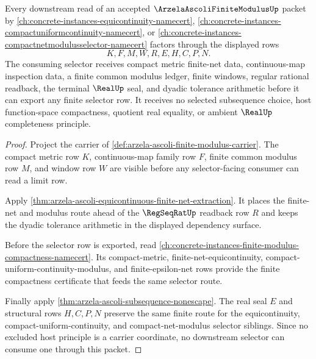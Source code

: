\begin{theorem}
\label{thm:arzela-ascoli-finite-modulus-forward-lattice}
Every downstream read of an accepted $\ArzelaAscoliFiniteModulusUp$ packet by \autoref{ch:concrete-instances-equicontinuity-namecert}, \autoref{ch:concrete-instances-compactuniformcontinuity-namecert}, or \autoref{ch:concrete-instances-compactnetmodulusselector-namecert} factors through the displayed rows
$$
K,F,M,W,R,E,H,C,P,N .
$$
The consuming selector receives compact metric finite-net data, continuous-map inspection data, a finite common modulus ledger, finite windows, regular rational readback, the terminal $\RealUp$ seal, and dyadic tolerance arithmetic before it can export any finite selector row. It receives no selected subsequence choice, host function-space compactness, quotient real equality, or ambient $\RealUp$ completeness principle.
\end{theorem}
\begin{proof}
Project the carrier of \autoref{def:arzela-ascoli-finite-modulus-carrier}. The compact metric row $K$, continuous-map family row $F$, finite common modulus row $M$, and window row $W$ are visible before any selector-facing consumer can read a limit row.

Apply \autoref{thm:arzela-ascoli-equicontinuous-finite-net-extraction}. It places the finite-net and modulus route ahead of the $\RegSeqRatUp$ readback row $R$ and keeps the dyadic tolerance arithmetic in the displayed dependency surface.

Before the selector row is exported, read \autoref{ch:concrete-instances-finite-modulus-compactness-namecert}. Its compact-metric, finite-net-equicontinuity, compact-uniform-continuity-modulus, and finite-epsilon-net rows provide the finite compactness certificate that feeds the same selector route.

Finally apply \autoref{thm:arzela-ascoli-subsequence-nonescape}. The real seal $E$ and structural rows $H,C,P,N$ preserve the same finite route for the equicontinuity, compact-uniform-continuity, and compact-net-modulus selector siblings. Since no excluded host principle is a carrier coordinate, no downstream selector can consume one through this packet.
\end{proof}

